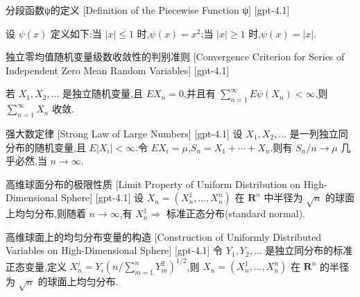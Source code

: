\documentclass[UTF8]{ctexart}
\begin{document}
    
    
    \begin{dfn}
        {分段函数ψ的定义}
        [Definition of the Piecewise Function ψ]
        [gpt-4.1]
        
设 $\psi(x)$ 定义如下:当 $|x| \leq 1$ 时,$\psi(x) = x^2$;当 $|x| \geq 1$ 时,$\psi(x) = |x|$.

    \end{dfn}
    
    
    
    \begin{thm}
        {独立零均值随机变量级数收敛性的判别准则}
        [Convergence Criterion for Series of Independent Zero Mean Random Variables]
        [gpt-4.1]
        
若 $X_1, X_2, \dots$ 是独立随机变量,且 $E X_n = 0$,并且有 $\sum_{n=1}^{\infty} E \psi(X_n) < \infty$,则 $\sum_{n=1}^{\infty} X_n$ 收敛.

    \end{thm}
    
    
    
    \begin{thm}
        {强大数定律}
        [Strong Law of Large Numbers]
        [gpt-4.1]
        设 $X_{1}, X_{2}, \ldots$ 是一列独立同分布的随机变量,且 $E|X_{i}| < \infty$.令 $E X_{i} = \mu$,$S_{n} = X_{1} + \cdots + X_{n}$.则有 $S_{n} / n \to \mu$ 几乎必然,当 $n \to \infty$.
    \end{thm}
    
    
    
    \begin{thm}
        {高维球面分布的极限性质}
        [Limit Property of Uniform Distribution on High-Dimensional Sphere]
        [gpt-4.1]
        设 $X_{n} = (X_{n}^{1}, \ldots, X_{n}^{n})$ 在 $\mathbf{R}^{n}$ 中半径为 $\sqrt{n}$ 的球面上均匀分布,则随着 $n \to \infty$,有 $X_{n}^{1} \Rightarrow$ 标准正态分布(standard normal).

    \end{thm}
    
    
    
    \begin{dfn}
        {高维球面上的均匀分布变量的构造}
        [Construction of Uniformly Distributed Variables on High-Dimensional Sphere]
        [gpt-4.1]
        令 $Y_{1}, Y_{2}, \ldots$ 是独立同分布的标准正态变量,定义 $X_{n}^{i} = Y_{i} \left( n / \sum_{m=1}^{n} Y_{m}^{2} \right)^{1/2}$,则 $X_{n} = (X_{n}^{1}, \ldots, X_{n}^{n})$ 在 $\mathbf{R}^{n}$ 的半径为 $\sqrt{n}$ 的球面上均匀分布.

    \end{dfn}
    
\end{document}
